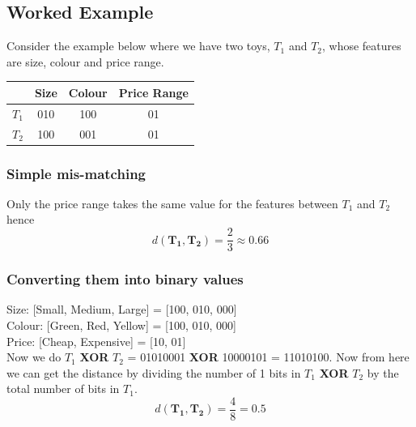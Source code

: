 \documentclass[11pt,fleqn]{book} %
\begin{document}
\subsection*{Worked Example}
Consider the example below where we have two toys, $T_1$ and $T_2$, whose features are size, colour and price range.
\begin{table}[h]
\centering
\begin{tabular}{c|c|c|c|}
\cline{2-4}
                         & Size & Colour & Price Range \\ \hline
\multicolumn{1}{|c|}{$T_1$} & 010  & 100    & 01       \\ \hline
\multicolumn{1}{|c|}{$T_2$} & 100  & 001    & 01      \\ \hline
\end{tabular}
\end{table}

\subsubsection*{Simple mis-matching}
Only the price range takes the same value for the features between $T_1$ and $T_2$ hence
$$d(\mathbf{T_1}, \mathbf{T_2}) = \frac{2}{3} \approx 0.66$$

\subsubsection*{Converting them into binary values}
Size: [Small, Medium, Large] = [100, 010, 000]\\
Colour: [Green, Red, Yellow] = [100, 010, 000]\\
Price: [Cheap, Expensive] = [10, 01]\\

\noindent
Now we do $T_1$ \textbf{XOR} $T_2$ = 01010001 \textbf{XOR} 10000101 = 11010100. Now from here we can get the distance by dividing the number of 1 bits in $T_1$ \textbf{XOR} $T_2$ by the total number of bits in $T_1$.
$$d(\mathbf{T_1}, \mathbf{T_2}) = \frac{4}{8} = 0.5$$
\end{document}
